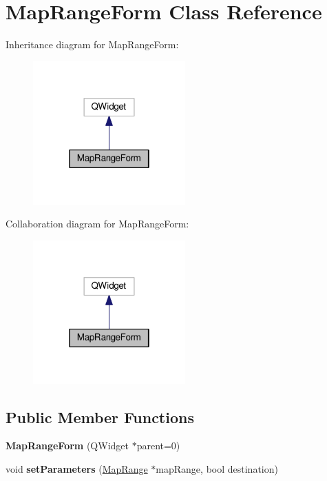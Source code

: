 \hypertarget{class_map_range_form}{}\section{Map\+Range\+Form Class Reference}
\label{class_map_range_form}


Inheritance diagram for Map\+Range\+Form\+:
\nopagebreak
\begin{figure}[H]
\begin{center}
\leavevmode
\includegraphics[width=166pt]{class_map_range_form__inherit__graph}
\end{center}
\end{figure}


Collaboration diagram for Map\+Range\+Form\+:
\nopagebreak
\begin{figure}[H]
\begin{center}
\leavevmode
\includegraphics[width=166pt]{class_map_range_form__coll__graph}
\end{center}
\end{figure}
\subsection*{Public Member Functions}
\begin{DoxyCompactItemize}
\item 
{\bfseries Map\+Range\+Form} (Q\+Widget $\ast$parent=0)\hypertarget{class_map_range_form_a1e1c057eecbc510515e387f05adadf18}{}\label{class_map_range_form_a1e1c057eecbc510515e387f05adadf18}

\item 
void {\bfseries set\+Parameters} (\hyperlink{class_map_range}{Map\+Range} $\ast$map\+Range, bool destination)\hypertarget{class_map_range_form_a5facfaf0523e935a2bfd1a9107f6e6a8}{}\label{class_map_range_form_a5facfaf0523e935a2bfd1a9107f6e6a8}

\end{DoxyCompactItemize}


